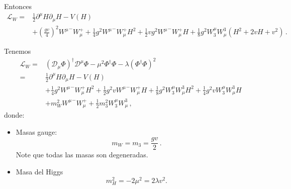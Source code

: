 Entonces
\begin{align}
  \label{eq:96qftm}
  \mathcal{L}_{W}=&\frac{1}{2}\partial^\mu H\partial_\mu H-V(H)\nonumber\\
  &+\left(\frac{gv}{4}\right)^2{W^\mu}^-W_\mu^++\frac{1}{4}g^2{W^\mu}^-W_\mu^+H^2+\frac{1}{2}vg^2{W^\mu}^-W_\mu^+H+\frac{1}{8}g^2 W_3^\mu W^3_\mu\left(H^2+2vH+v^2\right)\,.
\end{align}
\begin{frame}
Tenemos
\begin{align}
  \label{eq:lwbhfinm}
  \mathcal{L}_{W}=&\left( \mathcal{D}_\mu{\Phi} \right)^{\dagger}\mathcal{D}^\mu\Phi-\mu^2\Phi^{\dagger}\Phi-\lambda \left( \Phi^{\dagger}\Phi \right)^2 \nonumber\\
  =&\frac{1}{2}\partial^\mu H\partial_\mu H-V(H)\nonumber\\
&+\frac{1}{4}g^2{W^\mu}^-W_\mu^+H^2+\frac{1}{2}g^2v{W^\mu}^-W_\mu^+H
  +\frac{1}{8}g^2 W_3^\mu W^3_\mu H^2+\frac{1}{4}g^2v W_3^\mu W^3_\mu H\nonumber\\
  &+m_W^2{W^\mu}^-W_\mu^+ +\frac{1}{2}m_3^2W_3^\mu W^3_\mu\,,
\end{align}
donde:
\begin{itemize} %
\item Masas gauge:
\begin{equation}
  m_W=m_3=\frac{gv}{2}\,.
\end{equation}
Note que todas las masas son degeneradas.
\item Masa del Higgs
\begin{equation}
  m_H^2=-2\mu^2=2\lambda v^2.
\end{equation}
\end{itemize} %
\end{frame}



